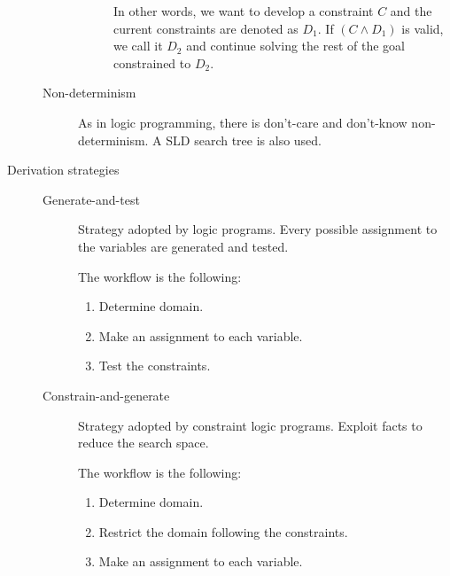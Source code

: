 \begin{description}
\begin{description}
\begin{description}
                        In other words, we want to develop a constraint $C$ and the current constraints are denoted as $D_1$.
                        If $(C \land D_1)$ is valid, we call it $D_2$ and continue solving the rest of the goal constrained to $D_2$.
                \end{description}

            \item[Non-determinism]
                As in logic programming, there is don't-care and don't-know non-determinism. 
                A SLD search tree is also used.
        \end{description} 

    \item[Derivation strategies] \phantom{}
        \begin{description}
            \item[Generate-and-test] 
                Strategy adopted by logic programs.
                Every possible assignment to the variables are generated and tested.
                
                The workflow is the following:
                \begin{enumerate}
                    \item Determine domain.
                    \item Make an assignment to each variable.
                    \item Test the constraints.
                \end{enumerate}

            \item[Constrain-and-generate] 
                Strategy adopted by constraint logic programs.
                Exploit facts to reduce the search space.

                The workflow is the following:
                \begin{enumerate}
                    \item Determine domain.
                    \item Restrict the domain following the constraints.
                    \item Make an assignment to each variable.
                \end{enumerate}
        \end{description}
\end{description}



